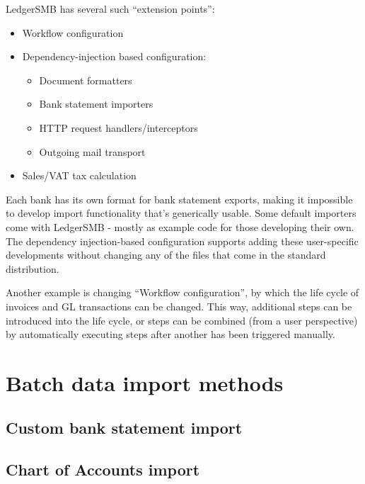 LedgerSMB has several such ``extension points'':

\begin{itemize}
	\item Workflow configuration
	\item Dependency-injection based configuration:
		\begin{itemize}
			\item Document formatters
			\item Bank statement importers
			\item HTTP request handlers/interceptors
			\item Outgoing mail transport
		\end{itemize}
	\item Sales/VAT tax calculation
\end{itemize}

Each bank has its own format for bank statement exports, making it impossible to develop import functionality that's generically usable.  Some default importers come with LedgerSMB - mostly as example code for those developing their own.  The dependency injection-based configuration supports adding these user-specific developments without changing any of the files that come in the standard distribution.

Another example is changing ``Workflow configuration'', by which the life cycle of invoices and GL transactions can be changed.  This way, additional steps can be introduced into the life cycle, or steps can be combined (from a user perspective) by automatically executing steps after another has been triggered manually.



\chapter{Batch data import methods}
\label{cha-customization-batch-import}

\section{Custom bank statement import}
\label{sec-customization-batch-import-bank-statement}

\section{Chart of Accounts import}
\label{subsec-customization-import-coa}

